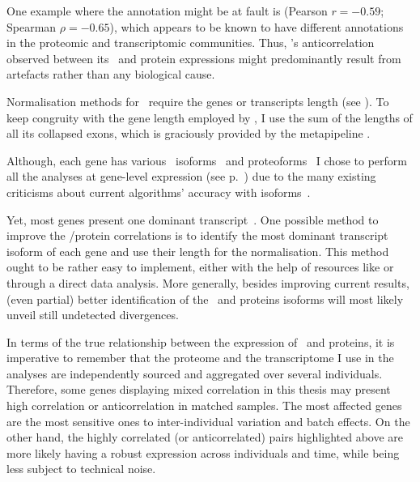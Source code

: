 One example where the annotation might be at fault is
 (Pearson $r=-0.59$; Spearman $\rho=-0.65$),
which appears to be known to have different annotations
in the proteomic and transcriptomic communities.
Thus, 's anticorrelation observed
between its \mRNA\ and protein expressions
might predominantly result from artefacts
rather than any biological cause.\mybr\

Normalisation methods for \Rnaseq\ require the genes or transcripts length
(see ).
To keep congruity with the gene length
employed by ,
I use the sum of the lengths of all its collapsed exons,
which is graciously provided by the metapipeline
.

Although, each gene has various \mRNA\ isoforms~
and proteoforms~
I chose to perform all the analyses at gene-level expression
(see p.~\pageref{minisec:quantNorm})
due to the many existing criticisms about
current algorithms' accuracy with isoforms~.\mybr\

Yet, most genes present one dominant transcript~.
One possible method to improve the \mRNA/protein correlations
is to identify the most dominant transcript isoform of each gene
and use their length for the normalisation.
This method ought to be rather easy to implement,
either with the help of resources like
or through a direct data analysis.
More generally,
besides improving current results,
(even partial) better identification of the \mRNAs\ and proteins isoforms
will most likely unveil still undetected divergences.\mybr\

In terms of the true relationship between the expression of \mRNAs\ and proteins,
it is imperative to remember that the proteome and the transcriptome I use
in the analyses are independently sourced and aggregated over several individuals.
Therefore, some genes displaying mixed correlation in this thesis may present
high correlation or anticorrelation in matched samples.
The most affected genes are the most sensitive ones
to inter-individual variation and batch effects.
On the other hand,
the highly correlated (or anticorrelated) pairs highlighted above
are more likely having a robust expression across individuals and time,
while being less subject to technical noise.\mybr\

